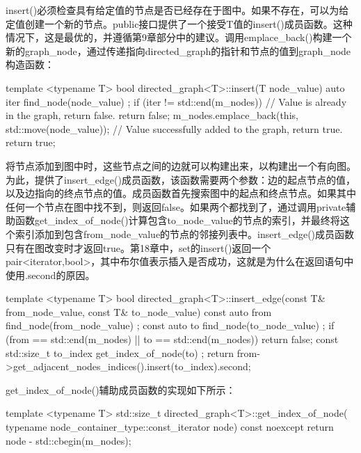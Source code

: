 insert()必须检查具有给定值的节点是否已经存在于图中。如果不存在，可以为给定值创建一个新的节点。public接口提供了一个接受T值的insert()成员函数。这种情况下，这是最优的，并遵循第9章部分中的建议。调用emplace\_back()构建一个新的graph\_node，通过传递指向directed\_graph的指针和节点的值到graph\_node构造函数：

\begin{cpp}
template <typename T>
bool directed_graph<T>::insert(T node_value)
{
    auto iter { find_node(node_value) };
    if (iter != std::end(m_nodes)) {
        // Value is already in the graph, return false.
        return false;
    }
    m_nodes.emplace_back(this, std::move(node_value));
    // Value successfully added to the graph, return true.
    return true;
}
\end{cpp}


将节点添加到图中时，这些节点之间的边就可以构建出来，以构建出一个有向图。为此，提供了insert\_edge()成员函数，该函数需要两个参数：边的起点节点的值，以及边指向的终点节点的值。成员函数首先搜索图中的起点和终点节点。如果其中任何一个节点在图中找不到，则返回false。如果两个都找到了，通过调用private辅助函数get\_index\_of\_node()计算包含to\_node\_value的节点的索引，并最终将这个索引添加到包含from\_node\_value的节点的邻接列表中。insert\_edge()成员函数只有在图改变时才返回true。第18章中，set的insert()返回一个pair<iterator,bool>，其中布尔值表示插入是否成功，这就是为什么在返回语句中使用.second的原因。

\begin{cpp}
template <typename T>
bool directed_graph<T>::insert_edge(const T& from_node_value,
    const T& to_node_value)
{
    const auto from { find_node(from_node_value) };
    const auto to { find_node(to_node_value) };
    if (from == std::end(m_nodes) || to == std::end(m_nodes)) {
        return false;
    }
    const std::size_t to_index { get_index_of_node(to) };
    return from->get_adjacent_nodes_indices().insert(to_index).second;
}
\end{cpp}

get\_index\_of\_node()辅助成员函数的实现如下所示：

\begin{cpp}
template <typename T>
std::size_t directed_graph<T>::get_index_of_node(
    typename node_container_type::const_iterator node) const noexcept
{
    return node - std::cbegin(m_nodes);
}
\end{cpp}


